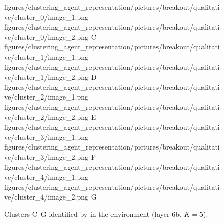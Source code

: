 \begin{figure}[H]
    \qualitativeClusterFigureSetup
    \qualitativeClusterTwo
        {figures/clustering_agent_representation/pictures/breakout/qualitative/cluster_0/image_1.png}
        {figures/clustering_agent_representation/pictures/breakout/qualitative/cluster_0/image_2.png}
        {C}
    \qualitativeClusterTwo
        {figures/clustering_agent_representation/pictures/breakout/qualitative/cluster_1/image_1.png}
        {figures/clustering_agent_representation/pictures/breakout/qualitative/cluster_1/image_2.png}
        {D}
    \qualitativeClusterTwo
        {figures/clustering_agent_representation/pictures/breakout/qualitative/cluster_2/image_1.png}
        {figures/clustering_agent_representation/pictures/breakout/qualitative/cluster_2/image_2.png}
        {E}
    \qualitativeClusterTwo
        {figures/clustering_agent_representation/pictures/breakout/qualitative/cluster_3/image_1.png}
        {figures/clustering_agent_representation/pictures/breakout/qualitative/cluster_3/image_2.png}
        {F}
    \qualitativeClusterTwo
        {figures/clustering_agent_representation/pictures/breakout/qualitative/cluster_4/image_1.png}
        {figures/clustering_agent_representation/pictures/breakout/qualitative/cluster_4/image_2.png}
        {G}
    \caption{Clusters C--G identified by  in the \BreakoutName environment (layer 6b, $K=5$).}
    \label{fig:qualitative_breakout}
\end{figure}
